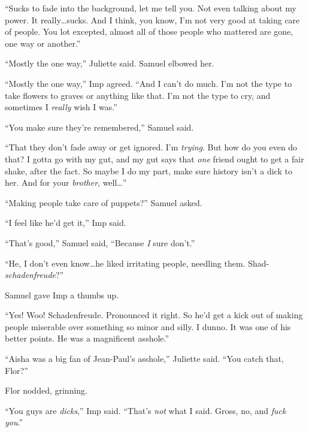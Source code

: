 ``Sucks to fade into the background, let me tell you.  Not even talking about my power.  It really\ldots sucks.  And I think, you know, I'm not very good at taking care of people.  You lot excepted, almost all of those people who mattered are gone, one way or another.''



``Mostly the one way,'' Juliette said.  Samuel elbowed her.



``Mostly the one way,'' Imp agreed.  ``And I can't do much.  I'm not the type to take flowers to graves or anything like that.  I'm not the type to cry, and sometimes I \emph{really} wish I was.''



``You make sure they're remembered,'' Samuel said.



``That they don't fade away or get ignored.  I'm \emph{trying}.  But how do you even do that?  I gotta go with my gut, and my gut says that \emph{one }friend ought to get a fair shake, after the fact.  So maybe I do my part, make sure history isn't a dick to her.  And for your \emph{brother}, well\ldots''



``Making people take care of puppets?''  Samuel asked.



``I feel like he'd get it,'' Imp said.



``That's good,'' Samuel said, ``Because \emph{I} sure don't.''



``He, I don't even know\ldots he liked irritating people, needling them.  Shad- \emph{schadenfreude}?''



Samuel gave Imp a thumbs up.



``Yes!  Woo!  Schadenfreude.  Pronounced it right.  So he'd get a kick out of making people miserable over something so minor and silly.  I dunno.  It was one of his better points.  He was a magnificent asshole.''



``Aisha was a big fan of Jean-Paul's asshole,'' Juliette said.  ``You catch that, Flor?''



Flor nodded, grinning.



``You guys are \emph{dicks},'' Imp said.  ``That's \emph{not} what I said.  Gross, no, and \emph{fuck you}.''



